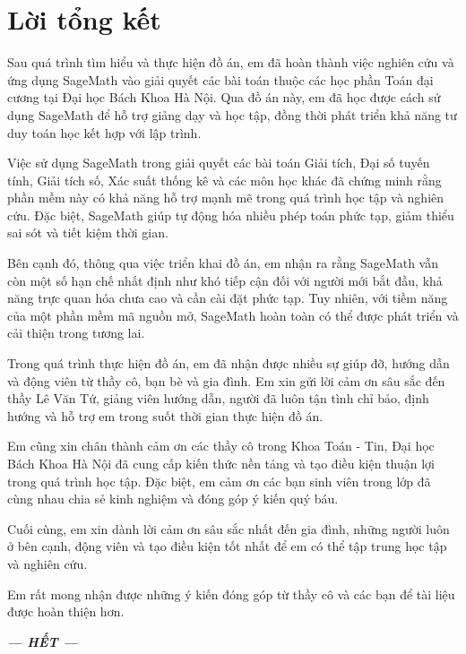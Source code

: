 \chapter*{Lời tổng kết}

Sau quá trình tìm hiểu và thực hiện đồ án, em đã hoàn thành việc nghiên cứu và ứng dụng SageMath vào giải quyết các bài toán thuộc các học phần Toán đại cương tại Đại học Bách Khoa Hà Nội. Qua đồ án này, em đã học được cách sử dụng SageMath để hỗ trợ giảng dạy và học tập, đồng thời phát triển khả năng tư duy toán học kết hợp với lập trình.

Việc sử dụng SageMath trong giải quyết các bài toán Giải tích, Đại số tuyến tính, Giải tích số, Xác suất thống kê và các môn học khác đã chứng minh rằng phần mềm này có khả năng hỗ trợ mạnh mẽ trong quá trình học tập và nghiên cứu. Đặc biệt, SageMath giúp tự động hóa nhiều phép toán phức tạp, giảm thiểu sai sót và tiết kiệm thời gian. 

Bên cạnh đó, thông qua việc triển khai đồ án, em nhận ra rằng SageMath vẫn còn một số hạn chế nhất định như khó tiếp cận đối với người mới bắt đầu, khả năng trực quan hóa chưa cao và cần cài đặt phức tạp. Tuy nhiên, với tiềm năng của một phần mềm mã nguồn mở, SageMath hoàn toàn có thể được phát triển và cải thiện trong tương lai.

Trong quá trình thực hiện đồ án, em đã nhận được nhiều sự giúp đỡ, hướng dẫn và động viên từ thầy cô, bạn bè và gia đình. Em xin gửi lời cảm ơn sâu sắc đến thầy Lê Văn Tứ, giảng viên hướng dẫn, người đã luôn tận tình chỉ bảo, định hướng và hỗ trợ em trong suốt thời gian thực hiện đồ án. 

Em cũng xin chân thành cảm ơn các thầy cô trong Khoa Toán - Tin, Đại học Bách Khoa Hà Nội đã cung cấp kiến thức nền tảng và tạo điều kiện thuận lợi trong quá trình học tập. Đặc biệt, em cảm ơn các bạn sinh viên trong lớp đã cùng nhau chia sẻ kinh nghiệm và đóng góp ý kiến quý báu.

Cuối cùng, em xin dành lời cảm ơn sâu sắc nhất đến gia đình, những người luôn ở bên cạnh, động viên và tạo điều kiện tốt nhất để em có thể tập trung học tập và nghiên cứu.

Em rất mong nhận được những ý kiến đóng góp từ thầy cô và các bạn để tài liệu được hoàn thiện hơn. 
\\
\begin{center}
	\textbf{\textit{--- HẾT ---}}
\end{center}
